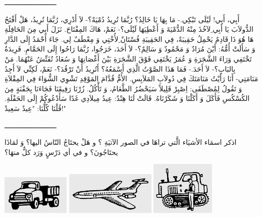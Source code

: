 \documentclass[a5paper]{article}
\begin{document}
ـــــــــــــــــــــــــ

أَبِي، أَبِي! لَيْلَى تَبْكِي.- مَا بِهَا يَا خَالِدُ؟ رُبَّمَا تُرِيدُ دُمْيَةً؟- لاَ أَدْرِي، رُبَّمَا تُرِيدُ، هَلْ أَفْتَحُ الدُّولاَبَ يَا أَبِي ِلآخُذَ مِنْهُ الدُّمْيَةَ وَ أَعْطِيَهَا لَيْلَى؟- نَعَمْ، هَاكَ المِفْتَاحَ. نَزَلَ أَبِي مِنَ الحَافِلَةِ هَا هُوَ ذَا قَادِمٌ يَحْمِلُ حَقِيبَةً، فِي الحَقِيبَةِ فُسْتَانٌ ِلأُخْتِي وَ مِعْطَفٌ لِي. جَاءَ أَحْمَدُ إِلَى الدَّارِ وَ سَأَلَتْ أُمُّهُ: أَيْنَ مُرَادٌ وَ مَحْمُودٌ وَ سَالِمٌ؟- لاَ أَحَدَ، خَرَجُوا، رُبَّمَا رَاحُوا إِلَى الحَمَّامِ. فَرِيدَةُ تَخْتَفِي وَرَاءَ الشَّجَرَةِ وَ عُمَرُ يَخْتَفِي فَوْقَ الشَّجَرَةِ بَيْنَ أَغْصَانِهَا وَ سُعَادُ تُفَتِّشُ عَنْهُمَا. مَنْ بِالبَابِ؟- لاَ أَحَدَ.- فَمَا هَذَا الصَّوْتُ الَّذِي أَسْمَعُهُ؟ أَتُرِيدُ أَنْ تَرْقُدَ؟- نَعَمْ، لَكِنِّي لاَ أَجِدُ مَنَامَتِي- أَنَا رَأَيْتُ مَنَامَتَكَ فِي دُولاَبِ المَلاَبِسِ. الأُمُّ قُدَّامَ المَوْقِدِ تَشْوِي الشُّوَاءَ فِي المِقْلاَةِ وَ تَقُولُ لِمُصْطَفَى: اِصْبِرْ قَلِيلاً سَيَحْضُرُ الطَّعَامُ، وَ تَأْكُلُ. زُرْنَا رَفِيقَنَا فَجَاءَنَا بِجَفْنَةٍ مِنَ الكُسْكُسِ فَأَكَلَ وَ أَكَلْنَا وَ شَكَرْنَاهُ. قَالَتْ لَنَا هِنْدٌ: عِيدُ مِيلاَدِي غَدًا سَأَدْعُوكُمْ إِلَى الحَفْلَةِ. قُلْنَا كُلُّنَا: "عِيدٌ سَعِيدْ!"

ـــــــــــــــــــــــــ

اذكر اسمَاء الأشيَاء الَّتي تراهَا في الصور الآتيَةِ ؟ و هَلْ يحتَاجُ النّاسُ اليها؟ وَ لمَاذَا يحتَاجُونَ؟ و في أي دَرْسٍ وَرَد كلٌّ منهَا؟ 

 \includegraphics[width=1.2811in,height=0.7398in]{images/MuhammadBagauddinprettified-img305.png}   \includegraphics[width=1.698in,height=0.802in]{images/MuhammadBagauddinprettified-img306.png}   \includegraphics[width=1.2083in,height=1.0102in]{images/MuhammadBagauddinprettified-img307.png} 
\end{document}
